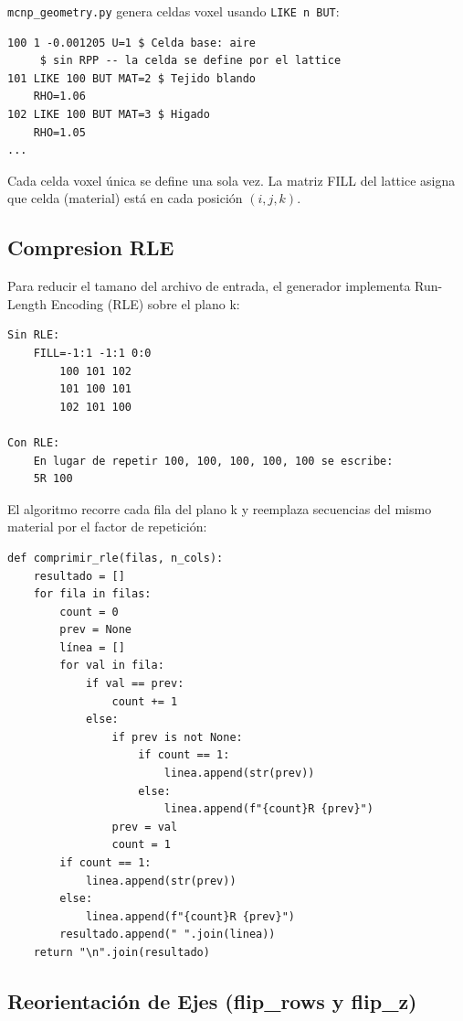 \documentclass[12pt,a4paper]{article}
\begin{document}
\texttt{mcnp\_geometry.py} genera celdas voxel usando \texttt{LIKE n BUT}:

\begin{lstlisting}
100 1 -0.001205 U=1 $ Celda base: aire
     $ sin RPP -- la celda se define por el lattice
101 LIKE 100 BUT MAT=2 $ Tejido blando
    RHO=1.06
102 LIKE 100 BUT MAT=3 $ Higado
    RHO=1.05
...
\end{lstlisting}

Cada celda voxel única se define una sola vez. La matriz FILL del lattice asigna que celda (material) está en cada posición $(i,j,k)$.

\subsection{Compresion RLE}

Para reducir el tamano del archivo de entrada, el generador implementa Run-Length Encoding (RLE) sobre el plano k:

\begin{lstlisting}
Sin RLE:
    FILL=-1:1 -1:1 0:0
        100 101 102
        101 100 101
        102 101 100

Con RLE:
    En lugar de repetir 100, 100, 100, 100, 100 se escribe:
    5R 100
\end{lstlisting}

El algoritmo recorre cada fila del plano k y reemplaza secuencias del mismo material por el factor de repetición:

\begin{lstlisting}
def comprimir_rle(filas, n_cols):
    resultado = []
    for fila in filas:
        count = 0
        prev = None
        línea = []
        for val in fila:
            if val == prev:
                count += 1
            else:
                if prev is not None:
                    if count == 1:
                        linea.append(str(prev))
                    else:
                        linea.append(f"{count}R {prev}")
                prev = val
                count = 1
        if count == 1:
            linea.append(str(prev))
        else:
            linea.append(f"{count}R {prev}")
        resultado.append(" ".join(linea))
    return "\n".join(resultado)
\end{lstlisting}

\subsection{Reorientación de Ejes (flip\_rows y flip\_z)}
\end{document}
